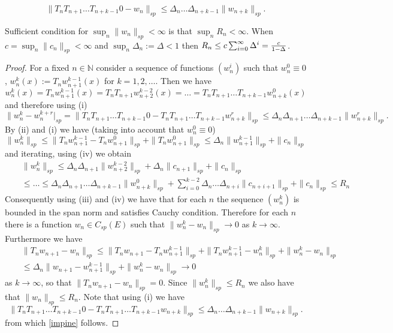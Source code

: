 \documentclass[10pt,a4paper]{amsart}
\begin{document}
\begin{equation}\label{impine}
\|T_nT_{n+1}\ldots T_{n+k-1}0-w_n\|_{sp}\leq  \Delta_n\ldots \Delta_{n+k-1}\|w_{n+k}\|_{sp}.
\end{equation}

\begin{remark}
Sufficient condition for $\sup_n\|w_n\|_{sp}<\infty$ is that $\sup_n R_n<\infty$. When $c=\sup_n \|c_n\|_{sp}<
\infty$ and $\sup_n \Delta_n:=\Delta < 1$  then $R_n\leq c \sum_{i=0}^\infty \Delta^{i}={c\over 1-\Delta}$.
\end{remark}

\begin{proof}
For a fixed $n\in \mathbb{N}$ consider a sequence of functions $(w_n^i)$ such that $w_n^0\equiv 0$, $w_n^k(x):=T_nw_{n+1}^{k-1}(x)$ for $k=1,2, \ldots$. Then we have
\begin{equation}
w_n^k(x)=T_nw_{n+1}^{k-1}(x)=T_nT_{n+1}w_{n+2}^{k-2}(x)=\ldots=T_nT_{n+1}\ldots T_{n+k-1}w_{n+k}^{0}(x)
\end{equation}
and therefore using (i)
\begin{equation}
\|w_n^k-w_n^{k+r}|_{sp}= \|T_nT_{n+1}\ldots T_{n+k-1}0-T_nT_{n+1}\ldots T_{n+k-1}w_{n+k}^{r}\|_{sp}\leq  \Delta_n\Delta_{n+1}\ldots\Delta_{n+k-1}\|w_{n+k}^{r}\|_{sp}.
\end{equation}
By (ii) and (i) we have (taking into account that $w_n^0\equiv 0$)
\begin{equation}
\|w_n^k\|_{sp}\leq \|T_nw_{n+1}^{k-1} - T_nw_{n+1}^0\|_{sp}+\|T_nw_{n+1}^0\|_{sp}\leq\Delta_n \|w_{n+1}^{k-1}\|_{sp}+\|c_n\|_{sp}
\end{equation}
and iterating, using (iv) we obtain
\begin{eqnarray}
&& \|w_n^k\|_{sp}\leq \Delta_n \Delta_{n+1} \|w_{n+2}^{k-2}\|_{sp} + \Delta_n\|c_{n+1}\|_{sp}+ \|c_{n}\|_{sp}\nonumber \\ && \leq \ldots
\leq  \Delta_n \Delta_{n+1}\ldots \Delta_{n+k-1}\|w_{n+k}^0\|_{sp}+\sum_{i=0}^{k-2} \Delta_n \ldots \Delta_{n+i}\|c_{n+i+1}\|_{sp} + \|c_n\|_{sp}\leq R_n
\end{eqnarray}
Consequently using (iii) and (iv) we have that for each $n$ the sequence $(w_n^k)$ is bounded in the span norm and satisfies Cauchy condition. Therefore for each $n$ there is a function $w_n\in C_{sp}(E)$ such that $\|w_n^k-w_n\|_{sp}\to 0$ as $k\to \infty$.
Furthermore we have
\begin{eqnarray}
&&\|T_nw_{n+1} - w_{n}\|_{sp}\leq \|T_nw_{n+1} - T_nw_{n+1}^{k-1}\|_{sp}+ \|T_nw_{n+1}^{k-1}-w_n^k\|_{sp}+ \|w_n^k-w_n\|_{sp} \\
&& \leq \Delta_n \|w_{n+1}-w_{n+1}^{k-1}\|_{sp} + \|w_n^k-w_n\|_{sp}\to 0 \nonumber
\end{eqnarray}
as $k\to \infty$, so that $\|T_nw_{n+1} - w_{n}\|_{sp}=0$. Since $\|w_n^k\|_{sp}\leq R_n$ we also have that
$\|w_n\|_{sp}\leq R_n$. Note that using (i) we have
\begin{equation}
\|T_nT_{n+1}\ldots T_{n+k-1}0-T_nT_{n+1}\ldots T_{n+k-1}w_{n+k}\|_{sp}\leq \Delta_n\ldots \Delta_{n+k-1}\|w_{n+k}\|_{sp}.
\end{equation}
from which \eqref{impine} follows.


\end{proof}
\end{document}
